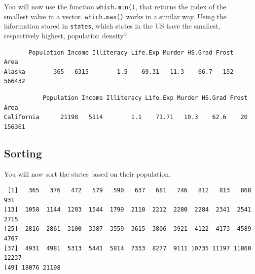 \documentclass[
]{book}
\newenvironment{Shaded}{\begin{snugshade}}{\end{snugshade}}
\newcommand{\KeywordTok}[1]{\textcolor[rgb]{0.13,0.29,0.53}{\textbf{#1}}}
\newcommand{\NormalTok}[1]{#1}
\newcommand{\OperatorTok}[1]{\textcolor[rgb]{0.81,0.36,0.00}{\textbf{#1}}}
\newcommand{\StringTok}[1]{\textcolor[rgb]{0.31,0.60,0.02}{#1}}
\begin{document}
You will now use the function \texttt{which.min()}, that returns the index of the smallest value in a vector. \texttt{which.max()} works in a similar way. Using the information stored in \texttt{states}, which states in the US have the smallest, respectively highest, population density?

\begin{Shaded}
\end{Shaded}

\begin{verbatim}
       Population Income Illiteracy Life.Exp Murder HS.Grad Frost   Area
Alaska        365   6315        1.5    69.31   11.3    66.7   152 566432
\end{verbatim}

\begin{Shaded}
\end{Shaded}

\begin{verbatim}
           Population Income Illiteracy Life.Exp Murder HS.Grad Frost   Area
California      21198   5114        1.1    71.71   10.3    62.6    20 156361
\end{verbatim}

\hypertarget{sorting}{%
\subsection{Sorting}\label{sorting}}

You will now sort the states based on their population.

\begin{Shaded}
\end{Shaded}

\begin{verbatim}
 [1]   365   376   472   579   590   637   681   746   812   813   868   931
[13]  1058  1144  1203  1544  1799  2110  2212  2280  2284  2341  2541  2715
[25]  2816  2861  3100  3387  3559  3615  3806  3921  4122  4173  4589  4767
[37]  4931  4981  5313  5441  5814  7333  8277  9111 10735 11197 11860 12237
[49] 18076 21198
\end{verbatim}
\end{document}
